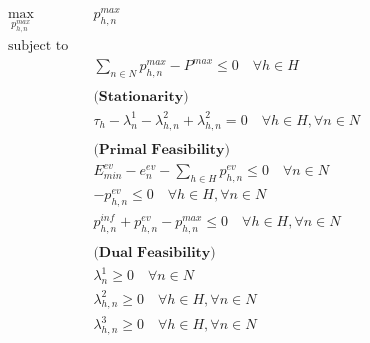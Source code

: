 \begin{align*}
	\max_{p^{max}_{h,n}} \quad & p^{max}_{h,n}                                                                                                          \\
	\text{subject to} \quad   &                                                                                                                        \\
	                          & \sum_{n\in N} p^{max}_{h,n} - P^{max} \leq 0 \quad \forall h \in H                                                     \\\\
	                          & \textbf{(Stationarity)}                                                                                                \\
	                          & \tau_h - \lambda^1_n - \lambda^2_{h,n}+ \lambda^2_{h,n} = 0 \quad \forall h \in H, \forall n \in N                                      \\\\
	                          & \textbf{(Primal Feasibility)}                                                                                          \\
	                          & E^{ev}_{min} - e^{ev}_n - \sum_{h \in H} p^{ev}_{h,n} \leq 0 \quad \forall n \in N                                     \\
	                          & -p^{ev}_{h,n}\leq 0 \quad \forall h \in H, \forall n \in N     \\
                              & p^{inf}_{h,n} + p^{ev}_{h,n} - p^{max}_{h,n} \leq 0 \quad \forall h \in H, \forall n \in N                             \\\\
	                          & \textbf{(Dual Feasibility)}                                                                                            \\
	                          & \lambda^1_n \geq 0 \quad \forall n \in N                                                                               \\
	                          & \lambda^2_{h,n} \geq 0 \quad \forall h \in H, \forall n \in N                                                          \\
                              & \lambda^3_{h,n} \geq 0 \quad \forall h \in H, \forall n \in N \\  \\

\end{align*}
